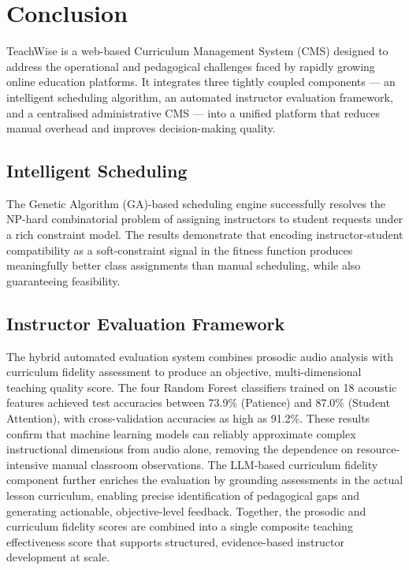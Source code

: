 \section{Conclusion}
\label{sec:conclusion}

TeachWise is a web-based Curriculum Management System (CMS) designed to address the operational and pedagogical challenges faced by rapidly growing online education platforms. It integrates three tightly coupled components — an intelligent scheduling algorithm, an automated instructor evaluation framework, and a centralised administrative CMS — into a unified platform that reduces manual overhead and improves decision-making quality.

\subsection{Intelligent Scheduling}
The Genetic Algorithm (GA)-based scheduling engine successfully resolves the NP-hard combinatorial problem of assigning instructors to student requests under a rich constraint model. The results demonstrate that encoding instructor-student compatibility as a soft-constraint signal in the fitness function produces meaningfully better class assignments than manual scheduling, while also guaranteeing feasibility.

\subsection{Instructor Evaluation Framework}
The hybrid automated evaluation system combines prosodic audio analysis with curriculum fidelity assessment to produce an objective, multi-dimensional teaching quality score. The four Random Forest classifiers trained on 18 acoustic features achieved test accuracies between 73.9\% (Patience) and 87.0\% (Student Attention), with cross-validation accuracies as high as 91.2\%. These results confirm that machine learning models can reliably approximate complex instructional dimensions from audio alone, removing the dependence on resource-intensive manual classroom observations. The LLM-based curriculum fidelity component further enriches the evaluation by grounding assessments in the actual lesson curriculum, enabling precise identification of pedagogical gaps and generating actionable, objective-level feedback. Together, the prosodic and curriculum fidelity scores are combined into a single composite teaching effectiveness score that supports structured, evidence-based instructor development at scale.

